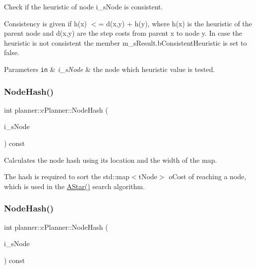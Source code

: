 Check if the heuristic of node i\+\_\+s\+Node is consistent. 

Consistency is given if h(x) $<$= d(x,y) + h(y), where h(x) is the heuristic of the parent node and d(x,y) are the step costs from parent x to node y. In case the heuristic is not consistent the member m\+\_\+s\+Result.\+b\+Consistent\+Heuristic is set to false. 
\begin{DoxyParams}[1]{Parameters}
\mbox{\tt in}  & {\em i\+\_\+s\+Node} & the node which heuristic value is tested. \\
\hline
\end{DoxyParams}
\mbox{\label{classplanner_1_1c_planner_a4c99873ce64b214899d65eda6366455f}} 
\subsubsection{\texorpdfstring{Node\+Hash()}{NodeHash()}\hspace{0.1cm}{\footnotesize\ttfamily [1/2]}}
{\footnotesize\ttfamily int planner\+::c\+Planner\+::\+Node\+Hash (\begin{DoxyParamCaption}\item[{std\+::shared\+\_\+ptr$<$ \mbox{\hyperlink{structplanner_1_1t_node}{t\+Node}} $>$ \&}]{i\+\_\+s\+Node }\end{DoxyParamCaption}) const}



Calculates the node hash using its location and the width of the map. 

The hash is required to sort the std\+::map$<$t\+Node$>$ o\+Cost of reaching a node, which is used in the \mbox{\hyperlink{classplanner_1_1c_planner_a341e70531266f023ac9461d18979d1ef}{A\+Star()}} search algorithm. \mbox{\label{classplanner_1_1c_planner_a4c99873ce64b214899d65eda6366455f}} 
\subsubsection{\texorpdfstring{Node\+Hash()}{NodeHash()}\hspace{0.1cm}{\footnotesize\ttfamily [2/2]}}
{\footnotesize\ttfamily int planner\+::c\+Planner\+::\+Node\+Hash (\begin{DoxyParamCaption}\item[{std\+::shared\+\_\+ptr$<$ \mbox{\hyperlink{structplanner_1_1t_node}{t\+Node}} $>$ \&}]{i\+\_\+s\+Node }\end{DoxyParamCaption}) const}



